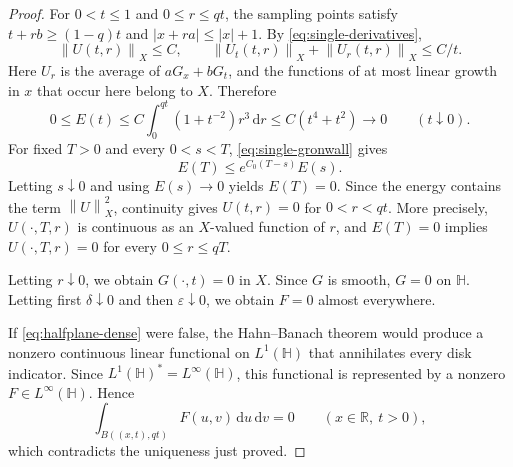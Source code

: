 \documentclass[10pt,a4paper]{amsart}
\newcommand{\dd}{\,\mathrm d}
\newcommand{\norm}[1]{\left\lVert#1\right\rVert}
\begin{document}
\begin{proof}
For $0<t\le1$ and $0\le r\le qt$, the sampling points satisfy
$t+rb\ge(1-q)t$ and $|x+ra|\le|x|+1$. By
\eqref{eq:single-derivatives},
\[
\norm{U(t,r)}_X\le C,
\qquad
\norm{U_t(t,r)}_X+\norm{U_r(t,r)}_X\le C/t.
\]
Here $U_r$ is the average of $aG_x+bG_t$, and the functions of at most
linear growth in $x$ that occur here belong to $X$. Therefore
\[
0\le E(t)\le C\int_0^{qt}(1+t^{-2})r^3\dd r
\le C(t^4+t^2)\longrightarrow0
\qquad(t\downarrow0).
\]
For fixed $T>0$ and every $0<s<T$, \eqref{eq:single-gronwall} gives
\[
E(T)\le e^{C_0(T-s)}E(s).
\]
Letting $s\downarrow0$ and using $E(s)\to0$ yields $E(T)=0$. Since the energy contains the term $\norm U_X^2$, continuity gives $U(t,r)=0$ for $0<r<qt$.
More precisely, $U(\cdot,T,r)$ is continuous as an $X$-valued function of
$r$, and $E(T)=0$ implies $U(\cdot,T,r)=0$ for every $0\le r\le qT$.

Letting $r\downarrow0$, we obtain $G(\cdot,t)=0$ in $X$.
Since $G$ is smooth, $G=0$ on $\mathbb H$.
Letting first $\delta\downarrow0$ and then $\varepsilon\downarrow0$, we obtain $F=0$ almost everywhere.
\medskip

If \eqref{eq:halfplane-dense} were false, the Hahn--Banach theorem would
produce a nonzero continuous linear functional on $L^1(\mathbb H)$ that
annihilates every disk indicator. Since
$L^1(\mathbb H)^*=L^\infty(\mathbb H)$, this functional is represented by a
nonzero $F\in L^\infty(\mathbb H)$. Hence
\[
\int_{B((x,t),qt)}F(u,v)\dd u\dd v=0
\qquad(x\in\mathbb R,\ t>0),
\]
which contradicts the uniqueness just proved.
\end{proof}
\end{document}
